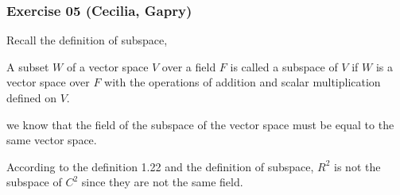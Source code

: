 \subsubsection*{Exercise 05 (Cecilia, Gapry)}

\begin{flushleft}
Recall the definition of subspace, \\
\vspace{10px}

A subset $W$ of a vector space $V$ over a field $F$ is called a subspace of $V$
if $W$ is a vector space over $F$ with the operations of addition and scalar
multiplication defined on $V$.
\vspace{10px}

we know that the field of the subspace of the vector space must be equal to 
the same vector space. 
\vspace{10px}

According to the definition 1.22 and the definition of subspace, 
$R^2$ is not the subspace of $C^2$ since they are not the same field.
\end{flushleft}
